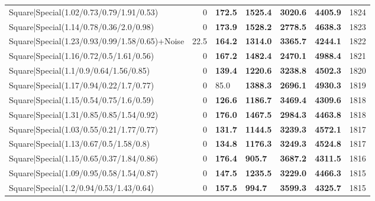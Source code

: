 \begin{tabular}{lrllllr}
 Square|Special(1.02/0.73/0.79/1.91/0.53)                      &             0   & \textbf{172.5} & \textbf{1525.4} & \textbf{3020.6} & \textbf{4405.9} &         1824 \\
 Square|Special(1.14/0.78/0.36/2.0/0.98)                       &             0   & \textbf{173.9} & \textbf{1528.2} & \textbf{2778.5} & \textbf{4638.3} &         1823 \\
 Square|Special(1.23/0.93/0.99/1.58/0.65)+Noise                &            22.5 & \textbf{164.2} & \textbf{1314.0} & \textbf{3365.7} & \textbf{4244.1} &         1822 \\
 Square|Special(1.16/0.72/0.5/1.61/0.56)                       &             0   & \textbf{167.2} & \textbf{1482.4} & \textbf{2470.1} & \textbf{4988.4} &         1821 \\
 Square|Special(1.1/0.9/0.64/1.56/0.85)                        &             0   & \textbf{139.4} & \textbf{1220.6} & \textbf{3238.8} & \textbf{4502.3} &         1820 \\
 Square|Special(1.17/0.94/0.22/1.7/0.77)                       &             0   & 85.0           & \textbf{1388.3} & \textbf{2696.1} & \textbf{4930.3} &         1819 \\
 Square|Special(1.15/0.54/0.75/1.6/0.59)                       &             0   & \textbf{126.6} & \textbf{1186.7} & \textbf{3469.4} & \textbf{4309.6} &         1818 \\
 Square|Special(1.31/0.85/0.85/1.54/0.92)                      &             0   & \textbf{176.0} & \textbf{1467.5} & \textbf{2984.3} & \textbf{4463.8} &         1818 \\
 Square|Special(1.03/0.55/0.21/1.77/0.77)                      &             0   & \textbf{131.7} & \textbf{1144.5} & \textbf{3239.3} & \textbf{4572.1} &         1817 \\
 Square|Special(1.13/0.67/0.5/1.58/0.8)                        &             0   & \textbf{134.8} & \textbf{1176.3} & \textbf{3249.3} & \textbf{4524.8} &         1817 \\
 Square|Special(1.15/0.65/0.37/1.84/0.86)                      &             0   & \textbf{176.4} & \textbf{905.7}  & \textbf{3687.2} & \textbf{4311.5} &         1816 \\
 Square|Special(1.09/0.95/0.58/1.54/0.87)                      &             0   & \textbf{147.5} & \textbf{1235.5} & \textbf{3229.0} & \textbf{4466.3} &         1815 \\
 Square|Special(1.2/0.94/0.53/1.43/0.64)                       &             0   & \textbf{157.5} & \textbf{994.7}  & \textbf{3599.3} & \textbf{4325.7} &         1815 \\

\end{tabular}
